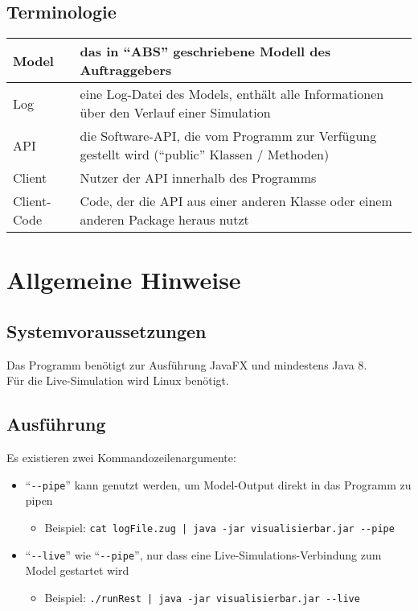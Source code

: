 \documentclass[accentcolor=tud0b,12pt,paper=a4]{tudreport}
\begin{document}
	\section{Terminologie}
		\begin{tabular}{| p{3cm} | p{13cm} |}
			\hline
			Model & das in "`ABS"' geschriebene Modell des Auftraggebers \\ \hline
			Log & eine Log-Datei des Models, enthält alle Informationen über den Verlauf einer Simulation \\ \hline
			API & die Software-API, die vom Programm zur Verfügung gestellt wird ("`public"' Klassen / Methoden) \\ \hline
			Client & Nutzer der API innerhalb des Programms \\ \hline
			Client-Code & Code, der die API aus einer anderen Klasse oder einem anderen Package heraus nutzt \\
			\hline
		\end{tabular}
		
	 	
	\chapter{Allgemeine Hinweise}
	
	\section{Systemvoraussetzungen}
	Das Programm benötigt zur Ausführung JavaFX und mindestens Java 8.\\
	Für die Live-Simulation wird Linux benötigt.
	
	\section{Ausführung}
	Es existieren zwei Kommandozeilenargumente:
	\begin{itemize}
		\item "`\texttt{-{}-pipe}"' kann genutzt werden, um Model-Output direkt in das Programm zu pipen
		\begin{itemize}
			\item Beispiel: \texttt{cat logFile.zug | java -jar visualisierbar.jar -{}-pipe}
		\end{itemize}
		\item "`\texttt{-{}-live}"' wie "`\texttt{-{}-pipe}"', nur dass eine Live-Simulations-Verbindung zum Model gestartet wird
		\begin{itemize}
			\item Beispiel: \texttt{./runRest | java -jar visualisierbar.jar -{}-live}
		\end{itemize}
	\end{itemize}
	
\end{document}
